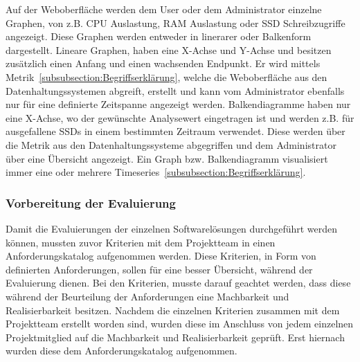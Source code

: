 Auf der Weboberfläche werden dem User oder dem Administrator einzelne Graphen,
von z.B. CPU Auslastung, RAM Auslastung oder SSD Schreibzugriffe angezeigt.
Diese Graphen werden entweder in linerarer oder Balkenform dargestellt.
Lineare Graphen, haben eine X-Achse und Y-Achse und besitzen
zusätzlich einen Anfang und einen wachsenden Endpunkt. Er wird mittels
Metrik~\ref{subsubsection:Begriffserklärung}, welche die Weboberfläche aus den
Datenhaltungssystemen abgreift, erstellt und kann vom Administrator ebenfalls
nur für eine definierte Zeitspanne angezeigt werden. Balkendiagramme haben nur
eine X-Achse, wo der gewünschte Analysewert eingetragen ist und werden z.B. für
ausgefallene SSDs in einem bestimmten Zeitraum verwendet. Diese werden über die
Metrik aus den Datenhaltungssysteme abgegriffen und dem Administrator über eine
Übersicht angezeigt. Ein Graph bzw. Balkendiagramm visualisiert immer eine
oder mehrere Timeseries~\ref{subsubsection:Begriffserklärung}.

\subsubsection{Vorbereitung der Evaluierung}
\label{subsubsec:vorbereiten_der_evaluierung_frontend}
Damit die Evaluierungen der einzelnen Softwarelösungen durchgeführt werden
können, mussten zuvor Kriterien mit dem Projektteam in einen Anforderungskatalog
aufgenommen werden. Diese Kriterien, in Form von definierten Anforderungen,
sollen für eine besser Übersicht, während der Evaluierung dienen. Bei den
Kriterien, musste darauf geachtet werden, dass diese während der Beurteilung
der Anforderungen eine Machbarkeit und Realisierbarkeit besitzen. Nachdem die
einzelnen Kriterien zusammen mit dem Projektteam erstellt worden sind, wurden
diese im Anschluss von jedem einzelnen Projektmitglied auf die Machbarkeit und
Realisierbarkeit geprüft. Erst hiernach wurden diese dem Anforderungskatalog
aufgenommen.

